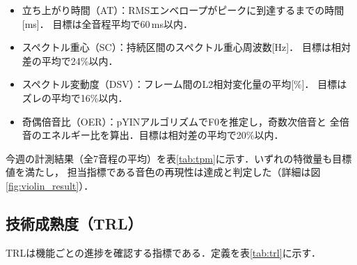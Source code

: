 \documentclass[lualatex,paper=a4paper,jafontsize=11.5pt,jafontscale=1.05]{jlreq}
\begin{document}
\begin{itemize}
  \item 立ち上がり時間（AT）：RMSエンベロープがピークに到達するまでの時間[ms]．
        目標は全音程平均で60\,ms以内\cite{Siedenburg}．
  \item スペクトル重心（SC）：持続区間のスペクトル重心周波数[Hz]．
        目標は相対差の平均で24\%以内\cite{Wun}．
  \item スペクトル変動度（DSV）：フレーム間のL2相対変化量の平均[\%]．
        目標はズレの平均で16\%以内\cite{McAdams}．
  \item 奇偶倍音比（OER）：pYINアルゴリズムでF0を推定し，奇数次倍音と
        全倍音のエネルギー比を算出．目標は相対差の平均で20\%以内\cite{Caclin}．
\end{itemize}

今週の計測結果（全7音程の平均）を表\ref{tab:tpm}に示す．いずれの特徴量も目標値を満たし，
担当指標である音色の再現性は達成と判定した（詳細は図\ref{fig:violin_result}）．

\begin{table}[H]
  \centering
  \caption{音色の再現性（TPM）計測結果}
  \label{tab:tpm}
\end{table}

\subsection{技術成熟度（TRL）}
TRLは機能ごとの進捗を確認する指標である．定義を表\ref{tab:trl}に示す．

\begin{table}[H]
  \centering
  \caption{TRLの定義}
  \label{tab:trl}
\end{table}
\end{document}
